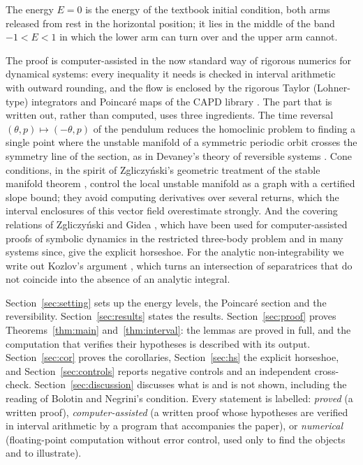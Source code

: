 \documentclass[11pt]{article}
\theoremstyle{definition}
\begin{document}
The energy $E = 0$ is the energy of the textbook initial condition, both arms released from rest in the horizontal position; it lies in the middle of the band $-1 < E < 1$ in which the lower arm can turn over and the upper arm cannot.

The proof is computer-assisted in the now standard way of rigorous numerics for dynamical systems: every inequality it needs is checked in interval arithmetic with outward rounding, and the flow is enclosed by the rigorous Taylor (Lohner-type) integrators and Poincar\'e maps of the CAPD library \cite{capd2021}. The part that is written out, rather than computed, uses three ingredients. The time reversal $(\theta, p) \mapsto (-\theta, p)$ of the pendulum reduces the homoclinic problem to finding a single point where the unstable manifold of a symmetric periodic orbit crosses the symmetry line of the section, as in Devaney's theory of reversible systems \cite{devaney1976}. Cone conditions, in the spirit of Zgliczy\'nski's geometric treatment of the stable manifold theorem \cite{z2009}, control the local unstable manifold as a graph with a certified slope bound; they avoid computing derivatives over several returns, which the interval enclosures of this vector field overestimate strongly. And the covering relations of Zgliczy\'nski and Gidea \cite{zg2004}, which have been used for computer-assisted proofs of symbolic dynamics in the restricted three-body problem \cite{wz2003} and in many systems since, give the explicit horseshoe. For the analytic non-integrability we write out Kozlov's argument \cite[Ch.~V, \S2]{kozlov1983}, which turns an intersection of separatrices that do not coincide into the absence of an analytic integral.

Section~\ref{sec:setting} sets up the energy levels, the Poincar\'e section and the reversibility. Section~\ref{sec:results} states the results. Section~\ref{sec:proof} proves Theorems~\ref{thm:main} and~\ref{thm:interval}: the lemmas are proved in full, and the computation that verifies their hypotheses is described with its output. Section~\ref{sec:cor} proves the corollaries, Section~\ref{sec:hs} the explicit horseshoe, and Section~\ref{sec:controls} reports negative controls and an independent cross-check. Section~\ref{sec:discussion} discusses what is and is not shown, including the reading of Bolotin and Negrini's condition. Every statement is labelled: \emph{proved} (a written proof), \emph{computer-assisted} (a written proof whose hypotheses are verified in interval arithmetic by a program that accompanies the paper), or \emph{numerical} (floating-point computation without error control, used only to find the objects and to illustrate).
\end{document}
